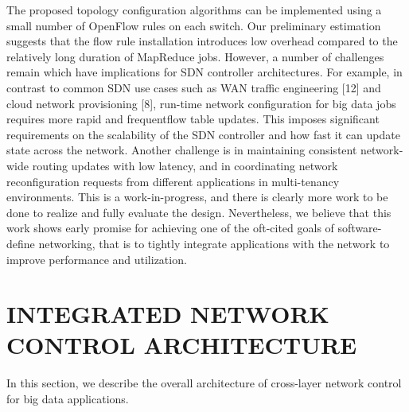 \documentclass[runningheads,a4paper]{llncs}
\begin{document}
The proposed topology configuration algorithms can be implemented using a small number of OpenFlow rules on each switch. Our preliminary estimation suggests that the flow rule installation introduces low overhead compared to the relatively long duration of MapReduce jobs. However, a number of challenges remain which have implications for SDN controller architectures. For example, in contrast to common SDN use cases such as WAN traffic engineering [12] and cloud network provisioning [8], run-time network configuration for big data jobs requires more rapid and frequentflow table updates. This imposes significant requirements on the scalability of the SDN controller and how fast it can update state across the network. Another challenge is in maintaining consistent network-wide routing updates with low latency, and in coordinating network reconfiguration requests from different applications in multi-tenancy environments.
This is a work-in-progress, and there is clearly more work to be done to realize and fully evaluate the design. Nevertheless, we believe that this work shows early promise for achieving one of the oft-cited goals of software-define networking, that is to tightly integrate applications with the network to improve performance and utilization.

\section{INTEGRATED NETWORK CONTROL ARCHITECTURE}
In this section, we describe the overall architecture of cross-layer network control for big data applications.
\end{document}
